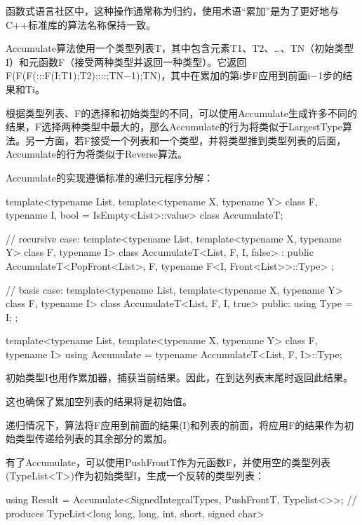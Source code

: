 \begin{notice}
函数式语言社区中，这种操作通常称为归约，使用术语“累加”是为了更好地与C++标准库的算法名称保持一致。
\end{notice}

Accumulate算法使用一个类型列表T，其中包含元素T1、T2、…、TN（初始类型I）和元函数F（接受两种类型并返回一种类型）。它返回F(F(F(:::F(I;T1);T2);:::;TN−1);TN)，其中在累加的第i步F应用到前面i−1步的结果和Ti。

根据类型列表、F的选择和初始类型的不同，可以使用Accumulate生成许多不同的结果，F选择两种类型中最大的，那么Accumulate的行为将类似于LargestType算法。另一方面，若F接受一个列表和一个类型，并将类型推到类型列表的后面，Accumulate的行为将类似于Reverse算法。

Accumulate的实现遵循标准的递归元程序分解：

\begin{cpp}
template<typename List,
		template<typename X, typename Y> class F,
		typename I,
		bool = IsEmpty<List>::value>
class AccumulateT;

// recursive case:
template<typename List,
		template<typename X, typename Y> class F,
		typename I>
class AccumulateT<List, F, I, false>
: public AccumulateT<PopFront<List>, F,
					typename F<I, Front<List>>::Type>
{
};

// basis case:
template<typename List,
		template<typename X, typename Y> class F,
		typename I>
class AccumulateT<List, F, I, true>
{
	public:
	using Type = I;
};

template<typename List,
		template<typename X, typename Y> class F,
		typename I>
using Accumulate = typename AccumulateT<List, F, I>::Type;
\end{cpp}

初始类型I也用作累加器，捕获当前结果。因此，在到达列表末尾时返回此结果。

\begin{notice}
这也确保了累加空列表的结果将是初始值。
\end{notice}

递归情况下，算法将F应用到前面的结果(I)和列表的前面，将应用F的结果作为初始类型传递给列表的其余部分的累加。

有了Accumulate，可以使用PushFrontT作为元函数F，并使用空的类型列表(TypeList<T>)作为初始类型I，生成一个反转的类型列表：

\begin{cpp}
using Result = Accumulate<SignedIntegralTypes, PushFrontT, Typelist<>>;
				// produces TypeList<long long, long, int, short, signed char>
\end{cpp}

